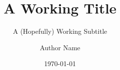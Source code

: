 \documentclass{beamer}
\title{A Working Title}
\subtitle{A (Hopefully) Working Subtitle}
\author{Author Name}
\date{\today}
\begin{document}
\begin{frame}
    \maketitle
\end{frame}
\end{document}

